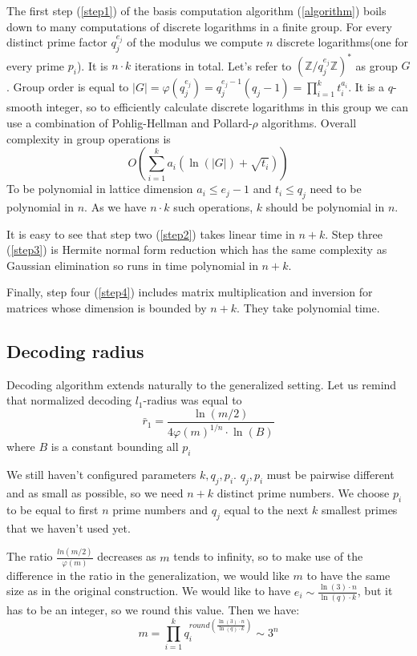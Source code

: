 \documentclass[12pt]{article}
\newcommand{\ZZ}{\mathbb{Z}}
\begin{document}
The first step (\ref{step1}) of the basis computation algorithm (\ref{algorithm}) boils down to many computations of discrete logarithms in a finite group. For every distinct prime factor $q_{j}^{e_{j}}$ of the modulus we compute $n$ discrete logarithms(one for every prime $p_{i}$). It is $n \cdot k$ iterations in total. Let's refer to $(\ZZ/q_{j}^{e_{j}}\ZZ)^*$ as group $G$. Group order is equal to $|G| = \varphi(q_{j}^{e_{j}}) =  q_{j}^{e_{j}-1}(q_{j}-1) = \prod_{i=1}^{k} t_{i}^{a_{i}}$.
It is a $q$-smooth integer, so to efficiently calculate discrete logarithms in this group we can use a combination of Pohlig-Hellman \cite{[PH78]} and Pollard-$\rho$ \cite{[Pol78]} algorithms. Overall complexity in group operations is
\[
    O(\sum_{i=1}^{k} a_{i}(\ln(|G|) + \sqrt{t_{i}}))
\]
To be polynomial in lattice dimension $a_{i} \leq e_{j}-1$ and $t_{i} \leq q_{j}$ need to be polynomial in $n$. As we have $n \cdot k$ such operations, $k$ should be polynomial in $n$.

It is easy to see that step two (\ref{step2}) takes linear time in $n + k$. Step three (\ref{step3}) is Hermite normal form reduction which has the same complexity as Gaussian elimination so runs in time polynomial in $n + k$.

Finally, step four (\ref{step4}) includes matrix multiplication and inversion for matrices whose dimension is bounded by $n + k$. They take polynomial time.


\subsection{Decoding radius}
\label{subsec:radius_integers}


Decoding algorithm extends naturally to the generalized setting. Let us remind that normalized decoding $l_{1}$-radius was equal to
\[
    \bar r_{1} = \frac{\ln(m/2)}{4 \varphi(m)^{1/n} \cdot \ln(B)}
\]
where $B$ is a constant bounding all $p_{i}$

We still haven't configured parameters $k, q_{j}, p_{i}$. $q_{j}, p_{i}$ must be pairwise different and as small as possible, so we need $n+k$ distinct prime numbers. We choose $p_{i}$ to be equal to first $n$ prime numbers and $q_{j}$ equal to the next $k$ smallest primes that we haven't used yet.

The ratio $\frac{ln(m/2)}{\varphi(m)}$ decreases as $m$ tends to infinity, so to make use of the difference in the ratio in the generalization, we would like $m$ to have the same size as in the original construction. We would like to have $e_i \sim \frac{\ln(3) \cdot n}{\ln(q) \cdot k}$, but it has to be an integer, so we round this value. Then we have:
\[
    m = \prod_{i = 1}^{k} q_i^{round(\frac{\ln(3) \cdot n}{\ln(q) \cdot k})} \sim 3^n
\]
\end{document}
